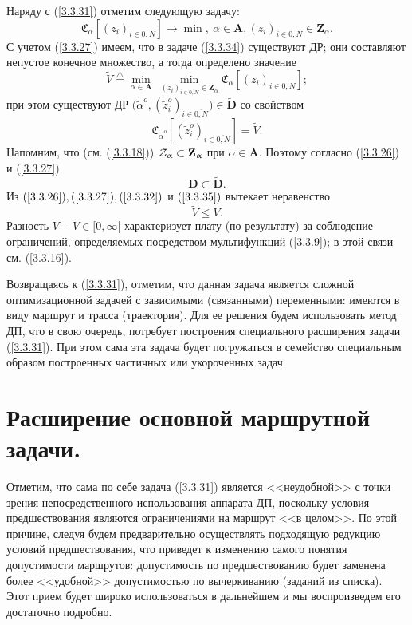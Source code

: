 \documentclass[11pt,twoside,openany]{report}
\newcommand{\bfn}{\begin{equation}}
\newcommand{\efn}{\end{equation}}
\newcommand{\df}{\stackrel{\triangle}{=}}
\newcommand{\ov}{\overline}
\newcommand{\al}{\alpha}
\newcommand{\su}{\subset}
\newcommand{\cz}{{\cal Z}}
\begin{document}
Наряду с (\ref{3.3.31}) отметим следующую задачу:
\bfn\label{3.3.34}\mathfrak{C}_\al[(z_i)_{i\in\ov{0,N}}]\longrightarrow \min,\
\al\in \mathbf{A}, (z_i)_{i\in\ov{0,N}}\in \mathbf{Z}_\al.
\efn
С учетом (\ref{3.3.27}) имеем, что в задаче (\ref{3.3.34}) существуют ДР; они
составляют непустое конечное множество, а тогда определено значение
\bfn\label{3.3.35}\widetilde{V} \df \min\limits_{\al\in\mathbf{A}}\
\min\limits_{(z_i)_{i\in\ov{0,N}}\in \mathbf{Z}_\al} \mathfrak{C}_\al[
(z_i)_{i\in\ov{0,N}}];
\efn
при этом существуют ДР $\bigl(\tilde{\al}^o,(\tilde{z}_i^o)_{i\in\ov{0,N}}
\bigl)\in \widetilde{\mathbf{D}}$ со свойством
\bfn\label{3.3.36}\mathfrak{C}_{\tilde{\al}^o}
[(\tilde{z}_i^o)_{i\in\ov{0,N}}] = \widetilde{V}.
\efn
Напомним, что (см. (\ref{3.3.18})) $\cz_\al \su \mathbf{Z}_\al$ при $\al\in
\mathbf{A}.$ Поэтому согласно (\ref{3.3.26}) и (\ref{3.3.27})
\bfn\label{3.3.37}\mathbf{D}\su \widetilde{\mathbf{D}}.
\efn
Из $(\ref{3.3.26}), (\ref{3.3.27}), (\ref{3.3.32})$ и $(\ref{3.3.35})$
вытекает неравенство
\bfn\label{3.3.38} \widetilde{V} \leqslant V.
\efn
Разность $V -\widetilde{V}\in [0,\infty[$ характеризует плату (по результату)
за соблюдение ограничений, определяемых посредством мультифункций (\ref{3.3.9});
в этой связи см. (\ref{3.3.16}).

Возвращаясь к (\ref{3.3.31}), отметим, что данная задача является сложной
оптимизационной задачей с зависимыми (связанными) переменными: имеются в виду
маршрут и трасса (траектория). Для ее решения будем использовать метод ДП, что
в свою очередь, потребует построения специального расширения задачи (\ref{3.3.31}).
При этом сама эта задача будет погружаться в семейство специальным образом
построенных частичных или укороченных задач.

\section{Расширение основной маршрутной задачи.}
\setcounter{equation}{0}

Отметим, что сама по себе задача (\ref{3.3.31}) является <<неудобной>> с точки
зрения непосредственного использования аппарата ДП, поскольку условия предшествования
являются ограничениями на маршрут <<в целом>>. По этой причине, следуя \cite{Cha1`,Cha2`,Cha3`}
будем предварительно осуществлять подходящую редукцию условий предшествования, что приведет
к изменению самого понятия допустимости маршрутов: допустимость по предшествованию будет
заменена более <<удобной>> допустимостью по вычеркиванию (заданий из списка). Этот прием
будет широко использоваться в дальнейшем и мы воспроизведем его достаточно подробно.
\end{document}
